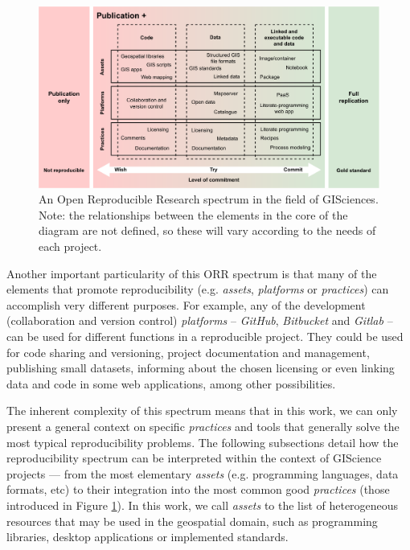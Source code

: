 \documentclass[ijgi,article,submit,moreauthors,pdftex]{Definitions/mdpi}
\begin{document}
\begin{figure}[!ht]
  \centering
  \includegraphics[width=\textwidth]{images/fig2.pdf}
  \caption{An Open Reproducible Research spectrum in the field of GISciences. Note: the relationships between the elements in the core of the diagram are not defined, so these will vary according to the needs of each project.}
  \label{fig:GisReproSpectrum}
\end{figure}

Another important particularity of this ORR spectrum is that many of the elements that promote reproducibility (e.g. \textit{assets}, \textit{platforms} or \textit{practices}) can accomplish very different purposes. For example, any of the development (collaboration and version control) \textit{platforms} -- \textit{GitHub}, \textit{Bitbucket} \cite{bitbucket} and \textit{Gitlab} \cite{gitlab} -- can be used for different functions in a reproducible project. They could be used for code sharing and versioning, project documentation and management, publishing small datasets, informing about the chosen licensing or even linking data and code in some web applications, among other possibilities. 

The inherent complexity of this spectrum means that in this work, we can only present a general context on specific \textit{practices} and tools that generally solve the most typical reproducibility problems. The following subsections detail how the reproducibility spectrum can be interpreted within the context of GIScience projects --- from the most elementary \textit{assets} (e.g. programming languages, data formats, etc) to their integration into the most common good \textit{practices} (those introduced in Figure \ref{fig:GisReproSpectrum}). In this work, we call \textit{assets} to the list of heterogeneous resources that may be used in the geospatial domain, such as programming libraries, desktop applications or implemented standards.
\end{document}
